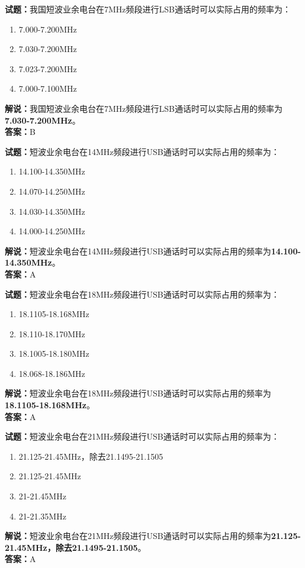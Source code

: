 \documentclass{ctexbook}
\begin{document}
\bigskip


\noindent\textbf{试题：}我国短波业余电台在7\unit{\MHz}频段进行LSB通话时可以实际占用的频率为：
\begin{enumerate}[leftmargin=3em]
\item 7.000-7.200\unit{\MHz}
\item 7.030-7.200\unit{\MHz}
\item 7.023-7.200\unit{\MHz}
\item 7.000-7.100\unit{\MHz}
\end{enumerate}
\noindent\textbf{解说：}我国短波业余电台在7\unit{\MHz}频段进行LSB通话时可以实际占用的频率为\textbf{7.030-7.200\unit{\MHz}}。\\\noindent\textbf{答案：}B



\bigskip


\noindent\textbf{试题：}短波业余电台在14\unit{\MHz}频段进行USB通话时可以实际占用的频率为：
\begin{enumerate}[leftmargin=3em]
\item 14.100-14.350\unit{\MHz}
\item 14.070-14.250\unit{\MHz}
\item 14.030-14.350\unit{\MHz}
\item 14.000-14.250\unit{\MHz}
\end{enumerate}
\noindent\textbf{解说：}短波业余电台在14\unit{\MHz}频段进行USB通话时可以实际占用的频率为\textbf{14.100-14.350\unit{\MHz}}。\\\noindent\textbf{答案：}A



\bigskip


\noindent\textbf{试题：}短波业余电台在18\unit{\MHz}频段进行USB通话时可以实际占用的频率为：
\begin{enumerate}[leftmargin=3em]
\item 18.1105-18.168\unit{\MHz}
\item 18.110-18.170\unit{\MHz}
\item 18.1005-18.180\unit{\MHz}
\item 18.068-18.186\unit{\MHz}
\end{enumerate}
\noindent\textbf{解说：}短波业余电台在18\unit{\MHz}频段进行USB通话时可以实际占用的频率为\textbf{18.1105-18.168\unit{\MHz}}。\\\noindent\textbf{答案：}A



\bigskip


\noindent\textbf{试题：}短波业余电台在21\unit{\MHz}频段进行USB通话时可以实际占用的频率为：
\begin{enumerate}[leftmargin=3em]
\item 21.125-21.45\unit{\MHz}，除去21.1495-21.1505
\item 21.125-21.45\unit{\MHz}
\item 21-21.45\unit{\MHz}
\item 21-21.35\unit{\MHz}
\end{enumerate}
\noindent\textbf{解说：}短波业余电台在21\unit{\MHz}频段进行USB通话时可以实际占用的频率为\textbf{21.125-21.45\unit{\MHz}，除去21.1495-21.1505}。\\\noindent\textbf{答案：}A
\end{document}
